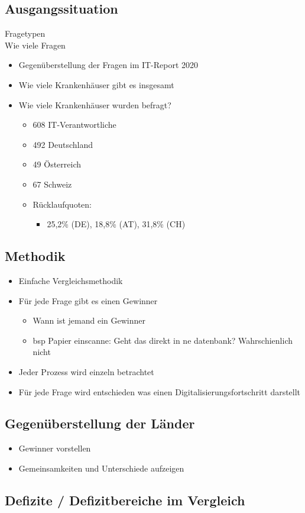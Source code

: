 \subsection{Ausgangssituation}
	Fragetypen\\
	Wie viele Fragen
\begin{itemize}
	\item Gegenüberstellung der Fragen im IT-Report 2020 \parencite{huebner2020}
	\item Wie viele Krankenhäuser gibt es insgesamt
	\item Wie viele Krankenhäuser wurden befragt? \parencite[31]{huebner2020}
	\begin{itemize}
		\item 608 IT-Verantwortliche
		\item 492 Deutschland
		\item 49 Österreich
		\item 67 Schweiz
		\item Rücklaufquoten:
		\begin{itemize}
			\item 25,2\% (DE), 18,8\% (AT), 31,8\% (CH)
		\end{itemize}
	\end{itemize}
\end{itemize}
\subsection{Methodik}
\begin{itemize}
	\item Einfache Vergleichsmethodik
	\item Für jede Frage gibt es einen Gewinner
	\begin{itemize}
		\item Wann ist jemand ein Gewinner
		\item bsp Papier einscanne: Geht das direkt in ne datenbank? Wahrschienlich nicht
	\end{itemize}
	\item Jeder Prozess wird einzeln betrachtet
	\item Für jede Frage wird entschieden was einen Digitalisierungsfortschritt darstellt
\end{itemize}

\subsection{Gegenüberstellung der Länder}
\begin{itemize}
	\item Gewinner vorstellen
	\item Gemeinsamkeiten und Unterschiede aufzeigen
\end{itemize}
\subsection{Defizite / Defizitbereiche im Vergleich}